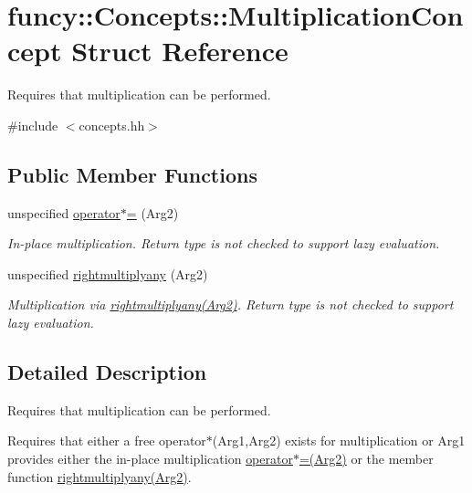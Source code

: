 \hypertarget{structfuncy_1_1Concepts_1_1MultiplicationConcept}{\section{funcy\-:\-:Concepts\-:\-:Multiplication\-Concept Struct Reference}
\label{structfuncy_1_1Concepts_1_1MultiplicationConcept}
}


Requires that multiplication can be performed.  




{\ttfamily \#include $<$concepts.\-hh$>$}

\subsection*{Public Member Functions}
\begin{DoxyCompactItemize}
\item 
unspecified \hyperlink{structfuncy_1_1Concepts_1_1MultiplicationConcept_a9d3936ac9b2eeb6640ee08080b22609c}{operator$\ast$=} (Arg2)
\begin{DoxyCompactList}\small\item\em In-\/place multiplication. Return type is not checked to support lazy evaluation. \end{DoxyCompactList}\item 
unspecified \hyperlink{structfuncy_1_1Concepts_1_1MultiplicationConcept_a6fe372a8aa8e9acf11174cf8cea8da63}{rightmultiplyany} (Arg2)
\begin{DoxyCompactList}\small\item\em Multiplication via \hyperlink{structfuncy_1_1Concepts_1_1MultiplicationConcept_a6fe372a8aa8e9acf11174cf8cea8da63}{rightmultiplyany(\-Arg2)}. Return type is not checked to support lazy evaluation. \end{DoxyCompactList}\end{DoxyCompactItemize}


\subsection{Detailed Description}
Requires that multiplication can be performed. 

Requires that either a free operator$\ast$(\-Arg1,\-Arg2) exists for multiplication or Arg1 provides either the in-\/place multiplication \hyperlink{structfuncy_1_1Concepts_1_1MultiplicationConcept_a9d3936ac9b2eeb6640ee08080b22609c}{operator$\ast$=(\-Arg2)} or the member function \hyperlink{structfuncy_1_1Concepts_1_1MultiplicationConcept_a6fe372a8aa8e9acf11174cf8cea8da63}{rightmultiplyany(\-Arg2)}. 

